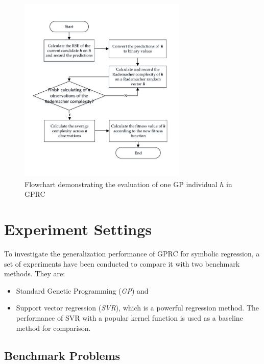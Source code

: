\documentclass[conference]{IEEEtran}
\begin{document}
\begin{figure}[!ht]
\centerline{\includegraphics[height=9cm, width=8cm]{evaluation}}
\caption{Flowchart demonstrating the evaluation of one GP individual $h$ in GPRC}
\label{fig:evaluation}
\end{figure}



\section{Experiment Settings}
\label{se:exp}

To investigate the generalization performance of GPRC for symbolic regression, a set of experiments have been conducted to compare it with two benchmark methods.
They are:

\begin{itemize}
	\item Standard Genetic Programming (\textit{GP}) and 
	\item Support vector regression (\textit{SVR}), which is a powerful regression method. The performance of SVR with a popular kernel function  is used as a baseline method for comparison.  
\end{itemize}

\subsection{Benchmark Problems}
\end{document}
